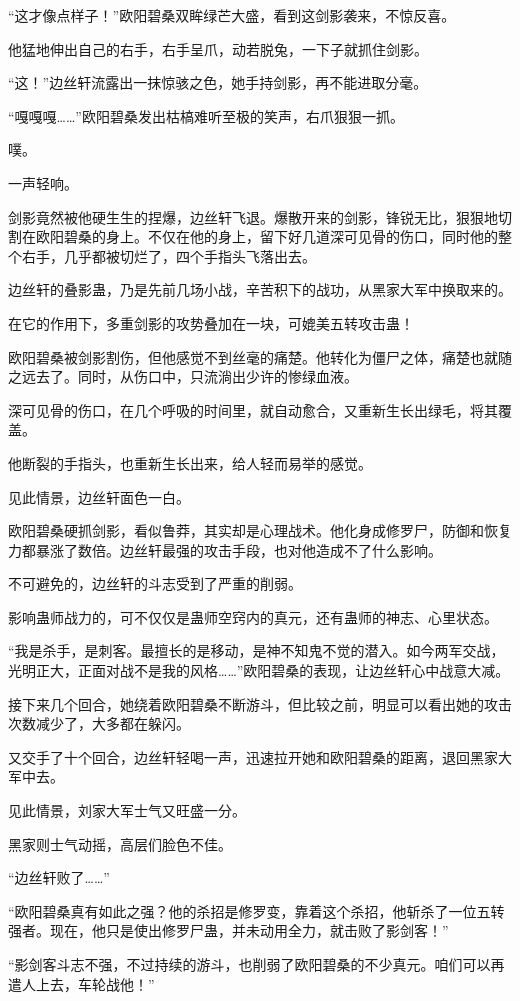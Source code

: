 \begin{this_body}
“这才像点样子！”欧阳碧桑双眸绿芒大盛，看到这剑影袭来，不惊反喜。

他猛地伸出自己的右手，右手呈爪，动若脱兔，一下子就抓住剑影。

“这！”边丝轩流露出一抹惊骇之色，她手持剑影，再不能进取分毫。

“嘎嘎嘎……”欧阳碧桑发出枯槁难听至极的笑声，右爪狠狠一抓。

噗。

一声轻响。

剑影竟然被他硬生生的捏爆，边丝轩飞退。爆散开来的剑影，锋锐无比，狠狠地切割在欧阳碧桑的身上。不仅在他的身上，留下好几道深可见骨的伤口，同时他的整个右手，几乎都被切烂了，四个手指头飞落出去。

边丝轩的叠影蛊，乃是先前几场小战，辛苦积下的战功，从黑家大军中换取来的。

在它的作用下，多重剑影的攻势叠加在一块，可媲美五转攻击蛊！

欧阳碧桑被剑影割伤，但他感觉不到丝毫的痛楚。他转化为僵尸之体，痛楚也就随之远去了。同时，从伤口中，只流淌出少许的惨绿血液。

深可见骨的伤口，在几个呼吸的时间里，就自动愈合，又重新生长出绿毛，将其覆盖。

他断裂的手指头，也重新生长出来，给人轻而易举的感觉。

见此情景，边丝轩面色一白。

欧阳碧桑硬抓剑影，看似鲁莽，其实却是心理战术。他化身成修罗尸，防御和恢复力都暴涨了数倍。边丝轩最强的攻击手段，也对他造成不了什么影响。

不可避免的，边丝轩的斗志受到了严重的削弱。

影响蛊师战力的，可不仅仅是蛊师空窍内的真元，还有蛊师的神志、心里状态。

“我是杀手，是刺客。最擅长的是移动，是神不知鬼不觉的潜入。如今两军交战，光明正大，正面对战不是我的风格……”欧阳碧桑的表现，让边丝轩心中战意大减。

接下来几个回合，她绕着欧阳碧桑不断游斗，但比较之前，明显可以看出她的攻击次数减少了，大多都在躲闪。

又交手了十个回合，边丝轩轻喝一声，迅速拉开她和欧阳碧桑的距离，退回黑家大军中去。

见此情景，刘家大军士气又旺盛一分。

黑家则士气动摇，高层们脸色不佳。

“边丝轩败了……”

“欧阳碧桑真有如此之强？他的杀招是修罗变，靠着这个杀招，他斩杀了一位五转强者。现在，他只是使出修罗尸蛊，并未动用全力，就击败了影剑客！”

“影剑客斗志不强，不过持续的游斗，也削弱了欧阳碧桑的不少真元。咱们可以再遣人上去，车轮战他！”


\end{this_body}
